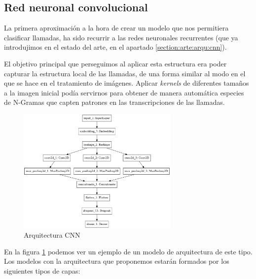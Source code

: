 \subsection{Red neuronal convolucional}

La primera aproximación a la hora de crear un modelo que nos permitiera clasificar llamadas, ha sido recurrir a las redes neuronales recurrentes (que ya introdujimos en el estado del arte, en el apartado \ref{section:arte:arqu:cnn}). 

El objetivo principal que perseguimos al aplicar esta estructura era poder capturar la estructura local de las llamadas, de una forma similar al modo en el que se hace en el tratamiento de imágenes. Aplicar \textit{kernels} de diferentes tamaños a la imagen inicial podía servirnos para obtener de manera automática especies de N-Gramas  que capten patrones en las transcripciones de las llamadas. 

\begin{figure}[!ht]
	\centering
	\includegraphics[width=0.7\textwidth]{images/super/arq_cnn}
	\caption{Arquitectura CNN}
	\label{fig:arqcnn}
\end{figure}


En la figura \ref{fig:arqcnn} podemos ver un ejemplo de un modelo de arquitectura de este tipo. Los modelos con la arquitectura que proponemos estarán formados por los siguientes tipos de capas: 

